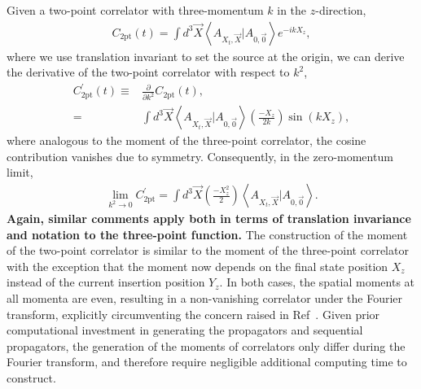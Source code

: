 \documentclass{PoS}
\newcommand{\dgr}[1]{\textcolor{David}{#1}}
\begin{document}
Given a two-point correlator with three-momentum $k$ in the $z$-direction,
\begin{align}
C_{\text{2pt}}(t) = \int d^3\vec{X} \left< A_{X_t,\vec{X}} | A_{0,\vec{0}}\right> e^{-ikX_z},
\label{eq:2pt}
\end{align}
where we use translation invariant to set the source at the origin, we can derive the derivative of the two-point correlator with respect to $k^2$,
\begin{align}
C^\prime_{\text{2pt}}(t) \equiv & \frac{\partial}{\partial k^2} C_{\text{2pt}}(t),  \nonumber\\
= & \int d^3\vec{X} \left<A_{X_t, \vec{X}} | A_{0,\vec{0}} \right> \left(\frac{-X_z}{2k}\right) \sin\left(kX_z\right),
\label{eq:2ptmoment}
\end{align}
where analogous to the moment of the three-point correlator, the cosine contribution vanishes due to symmetry.  Consequently, in the zero-momentum limit,
\begin{align}
\lim_{k^2\rightarrow 0 } C^\prime_{\text{2pt}} = \int d^3\vec{X} \left(\frac{-X_z^2}{2}\right)\left<A_{X_t, \vec{X}} | A_{0,\vec{0}} \right>.
\label{eq:2ptmoment0}
\end{align}
\dgr{\bfseries Again, similar comments apply both in terms of
  translation invariance and notation to the three-point function.}
The construction of the moment of the two-point correlator is similar
to the moment of the three-point correlator with the exception that
the moment now depends on the final state position $X_z$ instead of
the current insertion position $Y_z$. In both cases, the spatial
moments at all momenta are even, resulting in a non-vanishing
correlator under the Fourier transform, explicitly circumventing the
concern raised in Ref~\cite{Wilcox:2002zt}.  Given prior computational
investment in generating the
\dgr{propagators and sequential propagators, the}
generation of the moments of correlators only differ during the
Fourier transform, and therefore require negligible additional
computing time to construct.
\end{document}

